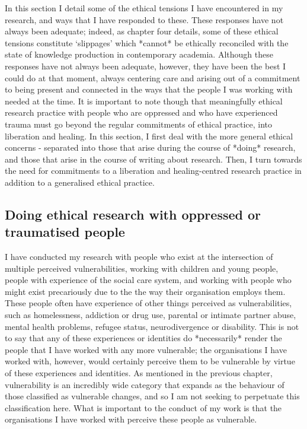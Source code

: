 In this section I detail some of the ethical tensions I have encountered in my research, and ways that I have responded to these. These responses have not always been adequate; indeed, as chapter four details, some of these ethical tensions constitute ‘slippages’ which *cannot* be ethically reconciled with the state of knowledge production in contemporary academia. Although these responses have not always been adequate, however, they have been the best I could do at that moment, always centering care and arising out of a  commitment to being present and connected in the ways that the people I was working with needed at the time. It is important to note though that meaningfully ethical research practice with people who are oppressed and who have experienced trauma must go beyond the regular commitments of ethical practice, into liberation and healing. In this section, I first deal with the more general ethical concerns -  separated into those that arise during the course of *doing* research, and those that arise in the course of writing about  research. Then, I turn towards the need for commitments to a liberation and healing-centred research practice in addition to a generalised ethical practice.

\subsection{Doing ethical research with oppressed or traumatised people}
I have conducted my research with people who exist at the intersection of multiple perceived vulnerabilities, working with children and young people, people with experience of the social care system, and working with people who might exist precariously due to the the way their organisation employs them. These people often have experience of other things  perceived as vulnerabilities, such as homelessness,  addiction or drug use, parental or intimate partner abuse, mental health problems, refugee status, neurodivergence or disability. This is not to say that any of these experiences or identities do *necessarily* render the people that I have worked with any more vulnerable; the organisations I have worked with, however, would certainly perceive them to be vulnerable by virtue of these experiences and identities. As mentioned in the previous chapter, vulnerability is an incredibly wide category that expands as the behaviour of those classified as vulnerable changes, and so I am not seeking to perpetuate this classification here. What is important to the conduct of my work is that the organisations I have worked with perceive these people as vulnerable. 

